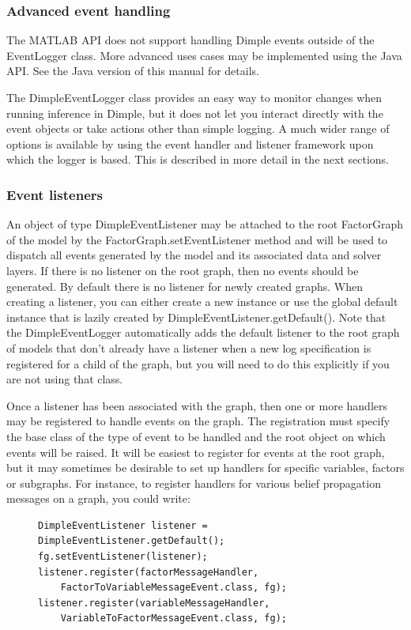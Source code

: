 \subsubsection{Advanced event handling}

\ifmatlab
The MATLAB API does not support handling Dimple events outside of the EventLogger
class. More advanced uses cases may be implemented using the Java API. See the Java version of this manual for details.
\fi

\ifjava
The DimpleEventLogger class provides an easy way to monitor changes when
running inference in Dimple, but it does not let you interact directly with 
the event objects or take actions other than simple logging. A much wider range of
options is available by using the event handler and listener framework upon which the
logger is based. This is described in more detail in the next sections.

\subsubsection{Event listeners}
An object of type DimpleEventListener may be attached to the root FactorGraph of the model by the FactorGraph.setEventListener method and will be used to dispatch all events generated by the model and its associated data and solver layers. If there is no listener on the root graph, then no events should be generated. By default there is no listener for newly created graphs. When creating a listener, you can either create a new instance or use the global default instance that is lazily created by DimpleEventListener.getDefault(). Note that the DimpleEventLogger automatically adds the default listener to the root graph of models that don't already have a listener when a new log specification is registered for a child of the graph, but you will need to do this explicitly if you are not using that class.

Once a listener has been associated with the graph, then one or more handlers may be registered to handle events on the graph. The registration must specify the base class of the type of event to be handled and the root object on which events will be raised. It will be easiest to register for events at the root graph, but it may sometimes be desirable to set up handlers for specific variables, factors or subgraphs. For instance, to register handlers for various belief propagation messages on a graph, you could write: 

\begin{figure}[H]
\begin{lstlisting}
DimpleEventListener listener = DimpleEventListener.getDefault();
fg.setEventListener(listener);
listener.register(factorMessageHandler,
    FactorToVariableMessageEvent.class, fg);
listener.register(variableMessageHandler,
    VariableToFactorMessageEvent.class, fg);
\end{lstlisting}
\end{figure}

